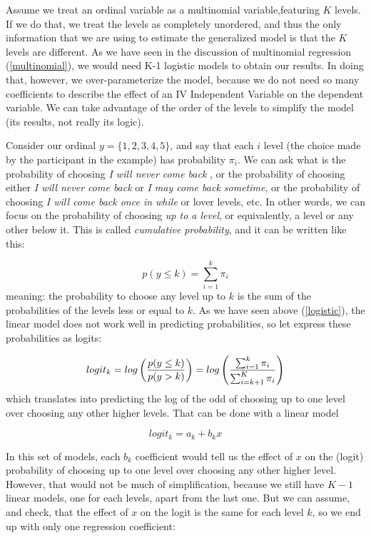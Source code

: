 \documentclass[
]{book}
\begin{document}
Assume we treat an ordinal variable as a multinomial variable,featuring \(K\) levels. If we do that, we treat the levels as completely unordered, and thus the only information that we are using to estimate the generalized model is that the \(K\) levels are different. As we have seen in the discussion of multinomial regression (\ref{multinomial}), we would need K-1 logistic models to obtain our results. In doing that, however, we over-parameterize the model, because we do not need so many coefficients to describe the effect of an {IV {Independent Variable} } on the dependent variable. We can take advantage of the order of the levels to simplify the model (its results, not really its logic).

Consider our ordinal \(y=\{1,2,3,4,5\}\), and say that each \(i\) level (the choice made by the participant in the example) has probability \(\pi_i\). We can ask what is the probability of choosing \emph{I will never come back }, or the probability of choosing either \emph{I will never come back} or \emph{I may come back sometime}, or the probability of choosing \emph{I will come back once in while} or lover levels, etc. In other words, we can focus on the probability of choosing \emph{up to a level}, or equivalently, a level or any other below it. This is called \emph{cumulative probability}, and it can be written like this:

\[
p(y\le k)=\sum_{i=1}^k \pi_i
\]
meaning: the probability to choose any level up to \(k\) is the sum of the probabilities of the levels less or equal to \(k\). As we have seen above (\ref{logistic}), the linear model does not work well in predicting probabilities, so let express these probabilities as logits:

\[
logit_k=log \left( {p(y\le k) \over p(y > k)}\right)=log \left({\sum_{i=1}^k \pi_i \over \sum_{i=k+1}^K \pi_i} \right)
\]
which translates into predicting the log of the odd of choosing up to one level over choosing any other higher levels. That can be done with a linear model

\[
logit_k=a_k+b_k x
\]

In this set of models, each \(b_k\) coefficient would tell us the effect of \(x\) on the (logit) probability of choosing up to one level over choosing any other higher level. However, that would not be much of simplification, because we still have \(K-1\) linear models, one for each levels, apart from the last one. But we can assume, and check, that the effect of \(x\) on the logit is the same for each level \(k\), so we end up with only one regression coefficient:
\end{document}
